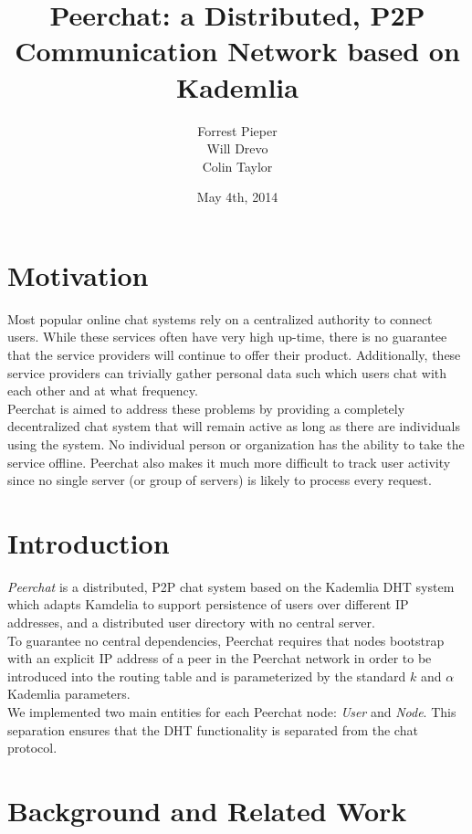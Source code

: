\documentclass{article}
\title{Peerchat: a Distributed, P2P \\ Communication Network based on Kademlia}
\author{
  Forrest Pieper\\
  Will Drevo\\
  Colin Taylor
}
\date{May 4th, 2014}
\begin{document}
\maketitle

\section{Motivation}
\label{Motivation}

Most popular online chat systems rely on a centralized authority to connect users. While these services often have very high up-time, there is no guarantee that the service providers will continue to offer their product. Additionally, these service providers can trivially gather personal data such which users chat with each other and at what frequency. \\

Peerchat is aimed to address these problems by providing a completely decentralized chat system that will remain active as long as there are individuals using the system. No individual person or organization has the ability to take the service offline. Peerchat also makes it much more difficult to track user activity since no single server (or group of servers) is likely to process every request.  

\section{Introduction}

\textit{Peerchat} is a distributed, P2P chat system based on the Kademlia DHT \cite{Maymounkov02} system which adapts Kamdelia to support persistence of users over different IP addresses, and a distributed user directory with no central server. \\

To guarantee no central dependencies, Peerchat requires that nodes bootstrap with an explicit IP address of a peer in the Peerchat network in order to be introduced into the routing table and is parameterized by the standard $k$ and $\alpha$ Kademlia parameters. \\

We implemented two main entities for each Peerchat node: \textit{User} and \textit{Node}. This separation ensures that the DHT functionality is separated from the chat protocol. 

\section{Background and Related Work}
\end{document}
